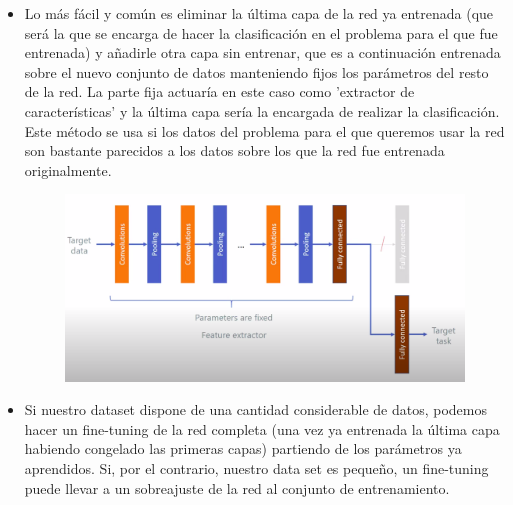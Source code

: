 \documentclass[a4paper,11pt]{article}
\begin{document}
\begin{itemize}
	\item Lo más fácil y común es eliminar la última capa de la red ya entrenada (que será la que se encarga de hacer la clasificación en el problema para el que fue entrenada) y añadirle otra capa sin entrenar, que es a continuación entrenada sobre el nuevo conjunto de datos manteniendo fijos los parámetros del resto de la red. La parte fija actuaría en este caso como 'extractor de características' y la última capa sería la encargada de realizar la clasificación. Este método se usa si los datos del problema para el que queremos usar la red son bastante parecidos a los datos sobre los que la red fue entrenada originalmente.  
	\begin{figure}[H]
		\centering
		\includegraphics[width=0.9\linewidth]{img/tl1}
		\caption{}
		\label{fig:tl1}
	\end{figure}
	
	\item Si nuestro dataset dispone de una cantidad considerable de datos, podemos hacer un fine-tuning de la red completa (una vez ya entrenada la última capa habiendo congelado las primeras capas) partiendo de los parámetros ya aprendidos. Si, por el contrario, nuestro data set es pequeño, un fine-tuning puede llevar a un sobreajuste de la red al conjunto de entrenamiento.
	

\end{itemize}
\end{document}
